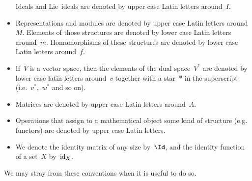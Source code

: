 \begin{itemize}
		Ideals and Lie~ideals are denoted by upper case Latin letters around~$I$.
	\item
		Representations and modules are denoted by upper case Latin letters around~$M$.
		Elements of those structures are denoted by lower case Latin letters around~$m$.
		Homomorphisms of these structures are denoted by lower case Latin letters around~$f$.
	\item
		If~$V$ is a vector space, then the elements of the dual space~$V^*$ are denoted by lower case latin letters around~$v$ together with a star~$*$ in the superscript (i.e.~$v^*$,~$w^*$ and so on).
	\item
		Matrices are denoted by upper case Latin letters around~$A$.
	\item
		Operations that assign to a mathematical object some kind of structure (e.g. functors) are denoted by upper case Latin letters.
	\item
		We denote the identity matrix of any size by~$\Id$, and the identity function of a set~$X$ by~$\mathrm{id}_X$.
\end{itemize}

We may stray from these conventions when it is useful to do so.

